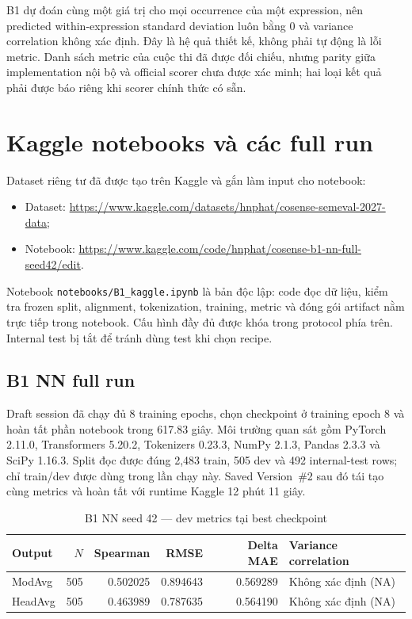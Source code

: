 \documentclass[11pt,a4paper]{article}
\newcommand{\code}[1]{\nolinkurl{#1}}
\begin{document}
B1 dự đoán cùng một giá trị cho mọi occurrence của một expression, nên predicted within-expression standard deviation luôn bằng 0 và variance correlation không xác định. Đây là hệ quả thiết kế, không phải tự động là lỗi metric. Danh sách metric của cuộc thi đã được đối chiếu, nhưng parity giữa implementation nội bộ và official scorer chưa được xác minh; hai loại kết quả phải được báo riêng khi scorer chính thức có sẵn.

\section{Kaggle notebooks và các full run}

Dataset riêng tư đã được tạo trên Kaggle và gắn làm input cho notebook:
\begin{itemize}
  \item Dataset: \url{https://www.kaggle.com/datasets/hnphat/cosense-semeval-2027-data};
  \item Notebook: \url{https://www.kaggle.com/code/hnphat/cosense-b1-nn-full-seed42/edit}.
\end{itemize}

Notebook \code{notebooks/B1_kaggle.ipynb} là bản độc lập: code đọc dữ liệu, kiểm tra frozen split, alignment, tokenization, training, metric và đóng gói artifact nằm trực tiếp trong notebook. Cấu hình đầy đủ được khóa trong protocol phía trên. Internal test bị tắt để tránh dùng test khi chọn recipe.

\subsection{B1 NN full run}

Draft session đã chạy đủ 8 training epochs, chọn checkpoint ở training epoch 8 và hoàn tất phần notebook trong 617.83 giây. Môi trường quan sát gồm PyTorch 2.11.0, Transformers 5.20.2, Tokenizers 0.23.3, NumPy 2.1.3, Pandas 2.3.3 và SciPy 1.16.3. Split đọc được đúng 2,483 train, 505 dev và 492 internal-test rows; chỉ train/dev được dùng trong lần chạy này. Saved Version~\#2 sau đó tái tạo cùng metrics và hoàn tất với runtime Kaggle 12 phút 11 giây.

\begin{table}[htbp]
\centering
\caption{B1 NN seed 42 --- dev metrics tại best checkpoint}
\small
\begin{tabularx}{\textwidth}{@{}lrrrrY@{}}
\toprule
Output & $N$ & Spearman & RMSE & Delta MAE & Variance correlation \\
\midrule
ModAvg  & 505 & 0.502025 & 0.894643 & 0.569289 & Không xác định (NA) \\
HeadAvg & 505 & 0.463989 & 0.787635 & 0.564190 & Không xác định (NA) \\
\bottomrule
\end{tabularx}
\end{table}
\end{document}
